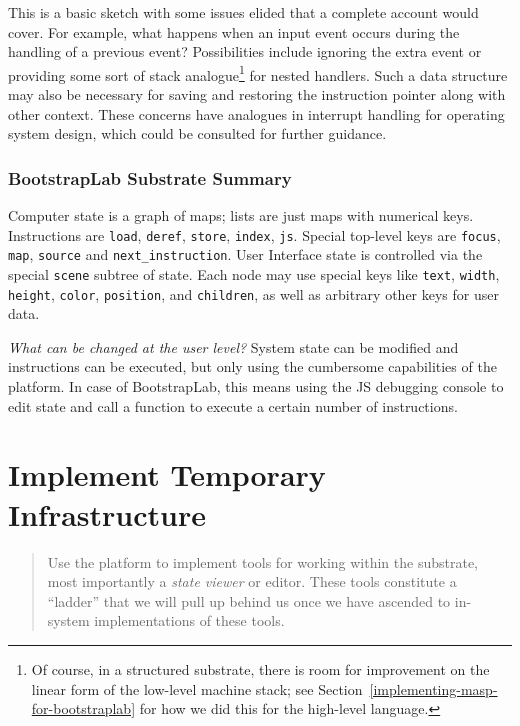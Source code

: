 \documentclass[ twoside,openright,titlepage,numbers=noenddot,headinclude,footinclude,cleardoublepage=empty,abstract=on,
                BCOR=5mm,paper=a4,fontsize=11pt
                ]{scrreprt}
\theoremstyle{definition}
\begin{document}
This is a basic sketch with some issues elided that a complete account
would cover. For example, what happens when an input event occurs during
the handling of a previous event? Possibilities include ignoring the
extra event or providing some sort of stack analogue\footnote{Of course,
  in a structured substrate, there is room for improvement on the linear
  form of the low-level machine stack; see
  Section~\ref{implementing-masp-for-bootstraplab} for how we did this
  for the high-level language.} for nested handlers. Such a data
structure may also be necessary for saving and restoring the instruction
pointer along with other context. These concerns have analogues in
interrupt handling for operating system design, which could be consulted
for further guidance.

\hypertarget{bootstraplab-substrate-summary}{\subsubsection{BootstrapLab Substrate
Summary}\label{bootstraplab-substrate-summary}}

Computer state is a graph of maps; lists are just maps with numerical
keys. Instructions are \texttt{load}, \texttt{deref}, \texttt{store},
\texttt{index}, \texttt{js}. Special top-level keys are \texttt{focus},
\texttt{map}, \texttt{source} and \texttt{next\_instruction}. User
Interface state is controlled via the special \texttt{scene} subtree of
state. Each node may use special keys like \texttt{text},
\texttt{width}, \texttt{height}, \texttt{color}, \texttt{position}, and
\texttt{children}, as well as arbitrary other keys for user data.

\emph{What can be changed at the user level?} System state can be
modified and instructions can be executed, but only using the cumbersome
capabilities of the platform. In case of BootstrapLab, this means using
the \ac{JS} debugging console to edit state and call a function to
execute a certain number of instructions.

\hypertarget{implement-temporary-infrastructure}{\section{Implement Temporary
Infrastructure}\label{implement-temporary-infrastructure}}

\begin{quote}
Use the platform to implement tools for working within the substrate,
most importantly a \emph{state viewer} or editor. These tools constitute
a ``ladder'' that we will pull up behind us once we have ascended to
in-system implementations of these tools.
\end{quote}
\end{document}
